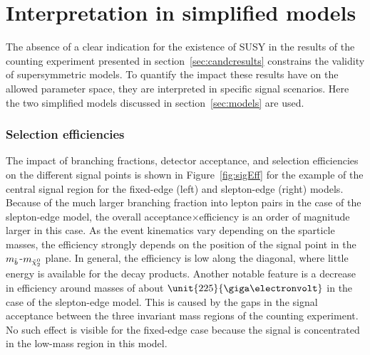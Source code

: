 \section{Interpretation in simplified models}
The absence of a clear indication for the existence of SUSY in the results of the counting experiment presented in section~\ref{sec:candcresults} constrains the validity of supersymmetric models. To quantify the impact these results have on the allowed parameter space, they are interpreted in specific signal scenarios. Here the two simplified models discussed in section~\ref{sec:models} are used. 

\subsubsection{Selection efficiencies}
The impact of branching fractions, detector acceptance, and selection efficiencies on the different signal points is shown in Figure~\ref{fig:sigEff} for the example of the central signal region for the fixed-edge (left) and slepton-edge (right) models. Because of the much larger branching fraction into lepton pairs in the case of the slepton-edge model, the overall acceptance$\times$efficiency is an order of magnitude larger in this case. As the event kinematics vary depending on the sparticle masses, the efficiency strongly depends on the position of the signal point in the $m_{\tilde{b}}$-$m_{{\tilde{\chi}^0_2}}$ plane. In general, the efficiency is low along the diagonal, where little energy is available for the decay products. Another notable feature is a decrease in efficiency around \secondchi masses of about $\unit{225}{\giga\electronvolt}$ in the case of the slepton-edge model. This is caused by the gaps in the signal acceptance between the three invariant mass regions of the counting experiment. No such effect is visible for the fixed-edge case because the signal is concentrated in the low-mass region in this model.  

